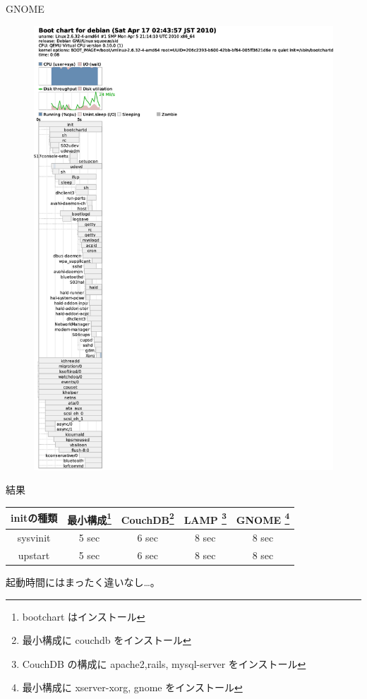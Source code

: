 \begin{frame}{GNOME}
\begin{minipage}[t]{0.48\hsize}
\begin{figure}[h]
\begin{center}
\includegraphics[width=1.0\hsize]{image201004/upstart/upstart-desktop-bootchart.eps}
\end{center}
\end{figure}
\end{minipage}
\end{frame}

\begin{frame}{結果}

\begin{table}
\begin{tabular}{|c|c|c|c|c|}\hline
initの種類 & 最小構成\footnote{bootchart はインストール} &
 CouchDB\footnote{最小構成に couchdb をインストール} & LAMP
 \footnote{CouchDB の構成に apache2,rails, mysql-server をインストール} & GNOME
 \footnote{最小構成に xserver-xorg, gnome をインストール} \\
\hline\hline
sysvinit & 5 sec & 6 sec & 8 sec & 8 sec \\
\hline
upstart & 5 sec & 6 sec & 8 sec & 8 sec \\
\hline
\end{tabular}
\end{table}
起動時間にはまったく違いなし…。
\end{frame}

